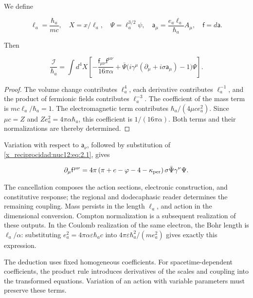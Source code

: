 We define



\[
\ell_a=\frac{\hbar_a}{mc},\quad X=x/\ell_a,\quad
\Psi=\ell_a^{3/2}\psi,\quad
\mathsf a_\mu=\frac{e_a\ell_a}{\hbar_a}A_\mu,\quad
\mathsf f=d\mathsf a.
\]



Then



\begin{equation}
\boxed{\frac{\mathcal I}{\hbar_a}=
\int d^4X\left[
-\frac{\mathsf f_{\mu\nu}\mathsf f^{\mu\nu}}{16\pi\alpha}
+\bar\Psi\bigl(i\gamma^\mu(\partial_\mu+i\sigma\mathsf a_\mu)-1\bigr)\Psi
\right].}
\label{x_reciprocidad:nuc12:eq:3.3}
\end{equation}



\begin{proof}
The volume change contributes \(\ell_a^4\), each derivative contributes \(\ell_a^{-1}\), and the product of fermionic fields contributes \(\ell_a^{-3}\). The coefficient of the mass term is \(mc\ell_a/\hbar_a=1\). The electromagnetic term contributes \(\hbar_a/(4\mu c e_a^2)\). Since \(\mu c=Z\) and \(Ze_a^2=4\pi\alpha\hbar_a\), this coefficient is \(1/(16\pi\alpha)\). Both terms and their normalizations are thereby determined.
\end{proof}

Variation with respect to \(\mathsf a_\nu\), followed by substitution of \eqref{x_reciprocidad:nuc12:eq:2.1}, gives



\begin{equation}
\partial_\mu\mathsf f^{\mu\nu}
=4\pi\left(\pi+e-\varphi-4-\kappa_{\rm per}\right)
\sigma\bar\Psi\gamma^\nu\Psi .
\label{x_reciprocidad:nuc12:eq:3.4}
\end{equation}



The cancellation composes the action sections, electronic construction, and constitutive response; the regional and dodecaphasic reader determines the remaining coupling. Mass persists in the length \(\ell_a\), and action in the dimensional conversion. Compton normalization is a subsequent realization of these outputs. In the Coulomb realization of the same electron, the Bohr length is \(\ell_a/\alpha\): substituting \(e_a^2=4\pi\alpha\varepsilon\hbar_a c\) into \(4\pi\varepsilon\hbar_a^2/(m e_a^2)\) gives exactly this expression.

The deduction uses fixed homogeneous coefficients. For spacetime-dependent coefficients, the product rule introduces derivatives of the scales and coupling into the transformed equations. Variation of an action with variable parameters must preserve these terms.

